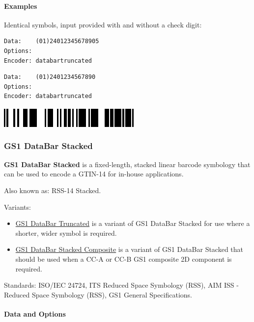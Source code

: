 \hypertarget{examples-28}{%
\paragraph{Examples}\label{examples-28}}

Identical symbols, input provided with and without a check digit:

\begin{verbatim}
Data:    (01)24012345678905
Options: 
Encoder: databartruncated
\end{verbatim}

\begin{verbatim}
Data:    (01)2401234567890
Options: 
Encoder: databartruncated
\end{verbatim}

\includegraphics{images/databartruncated-1.eps}

\hypertarget{gs1-databar-stacked}{%
\subsubsection{GS1 DataBar Stacked}\label{gs1-databar-stacked}}

\textbf{GS1 DataBar Stacked} is a fixed-length, stacked linear barcode
symbology that can be used to encode a GTIN-14 for in-house
applications.

Also known as: RSS-14 Stacked.

Variants:

\begin{itemize}
\tightlist
\item
  \protect\hyperlink{gs1-databar-truncated}{GS1 DataBar Truncated} is a
  variant of GS1 DataBar Stacked for use where a shorter, wider symbol
  is required.
\item
  \protect\hyperlink{gs1-composite-symbols}{GS1 DataBar Stacked
  Composite} is a variant of GS1 DataBar Stacked that should be used
  when a CC-A or CC-B GS1 composite 2D component is required.
\end{itemize}

Standards: ISO/IEC 24724, ITS Reduced Space Symbology (RSS), AIM ISS -
Reduced Space Symbology (RSS), GS1 General Specifications.

\hypertarget{data-and-options-39}{%
\paragraph{Data and Options}\label{data-and-options-39}}

